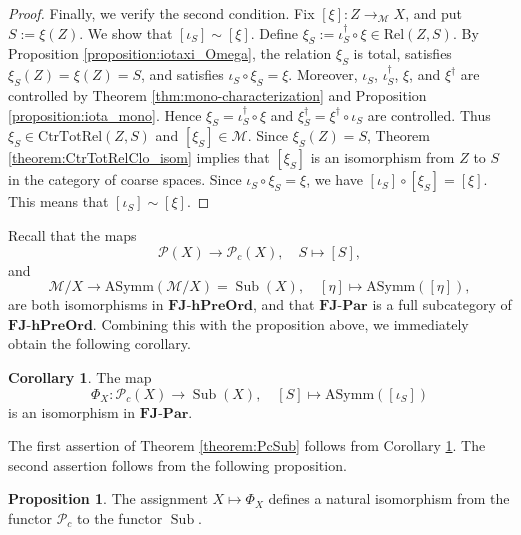 \documentclass[12pt, a4paper]{amsart}
\theoremstyle{definition}
\newtheorem{corollary}[theorem]{Corollary}
\newtheorem{proposition}[theorem]{Proposition}
\newcommand{\Rel}{\mathrm{Rel}}
\newcommand{\CtrTotRel}{\mathrm{CtrTotRel}}
\newcommand{\AS}{\mathrm{ASymm}}
\newcommand{\FinJoinParOrd}{\mathbf{FJ}\text{-}\mathbf{Par}}
\newcommand{\hFinJoinPreOrd}{\mathbf{FJ}\text{-}\mathbf{hPreOrd}}
\newcommand{\Sub}{\operatorname{Sub}}
\begin{document}
\begin{proof}
Finally, we verify the second condition. Fix $[\xi]:Z\rightarrow_{\mathcal{M}}X$, and put $S:=\xi(Z)$. We show that $[\iota_S]\sim[\xi]$. Define $\xi_S:=\iota_S^{\dagger}\circ\xi\in\Rel(Z,S)$. By Proposition \ref{proposition:iotaxi_Omega}, the relation $\xi_S$ is total, satisfies $\xi_S(Z)=\xi(Z)=S$, and satisfies $\iota_S\circ\xi_S=\xi$. Moreover, $\iota_S$, $\iota_S^{\dagger}$, $\xi$, and $\xi^{\dagger}$ are controlled by Theorem \ref{thm:mono-characterization} and Proposition \ref{proposition:iota_mono}. Hence $\xi_S=\iota_S^{\dagger}\circ\xi$ and $\xi_S^{\dagger}=\xi^{\dagger}\circ\iota_S$ are controlled. Thus $\xi_S\in\CtrTotRel(Z,S)$ and $[\xi_S]\in\mathcal{M}$. Since $\xi_S(Z)=S$, Theorem \ref{theorem:CtrTotRelClo_isom} implies that $[\xi_S]$ is an isomorphism from $Z$ to $S$ in the category of coarse spaces. Since $\iota_S\circ\xi_S=\xi$, we have $[\iota_S]\circ[\xi_S]=[\xi]$. This means that $[\iota_S]\sim[\xi]$.
\end{proof}

Recall that the maps
\[
\mathcal{P}(X)\rightarrow\mathcal{P}_c(X),\quad S\mapsto [S],
\]
and
\[
\mathcal{M}/X\rightarrow\AS(\mathcal{M}/X) = \Sub(X),\quad [\eta]\mapsto \AS([\eta]),
\]
are both isomorphisms in $\hFinJoinPreOrd$, and that $\FinJoinParOrd$ is a full subcategory of $\hFinJoinPreOrd$. Combining this with the proposition above, we immediately obtain the following corollary.

\begin{corollary}\label{corollary:PhiXisisom}
The map
\[
\Phi_X:\mathcal{P}_c(X)\rightarrow \Sub(X),\quad [S]\mapsto\AS([\iota_S])
\]
is an isomorphism in $\FinJoinParOrd$.
\end{corollary}

The first assertion of Theorem \ref{theorem:PcSub} follows from Corollary \ref{corollary:PhiXisisom}. The second assertion follows from the following proposition.

\begin{proposition}\label{proposition:PhigivesNatIsom}
The assignment $X\mapsto\Phi_X$ defines a natural isomorphism from the functor $\mathcal{P}_c$ to the functor $\Sub$.
\end{proposition}
\end{document}
